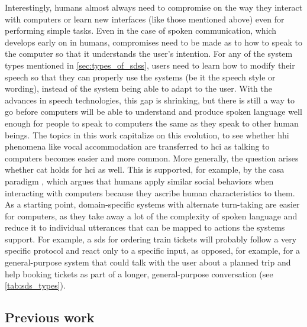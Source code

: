 Interestingly, humans almost always need to compromise on the way they interact with computers or learn new interfaces (like those mentioned above) even for performing simple tasks.
Even in the case of spoken communication, which develops early on in humans, compromises need to be made as to how to speak to the computer so that it understands the user's intention.
For any of the system types mentioned in \cref{sec:types_of_sdss}, users need to learn how to modify their speech so that they can properly use the systems (be it the speech style or wording), instead of the system being able to adapt to the user.
With the advances in speech technologies, this gap is shrinking, but there is still a way to go before computers will be able to understand and produce spoken language well enough for people to speak to computers the same as they speak to other human beings.
The topics in this work capitalize on this evolution, to see whether \ac{hhi} phenomena like vocal accommodation are transferred to \ac{hci} as talking to computers becomes easier and more common.
More generally, the question arises whether \ac{cat} holds for \ac{hci} as well.
This is supported, for example, by the \ac{casa} paradigm \citep{Nass1994computers, Nass2000machines},
which argues that humans apply similar social behaviors when interacting with computers because they ascribe human characteristics to them.
As a starting point, domain-specific systems with alternate turn-taking are easier for computers, as they take away a lot of the complexity of spoken language and reduce it to individual utterances that can be mapped to actions the systems support.
For example, a \ac{sds} for ordering train tickets will probably follow a very specific protocol and react only to a specific input, as opposed, for example, for a general-purpose system that could talk with the user about a planned trip and help booking tickets as part of a longer, general-purpose conversation (see \cref{tab:sds_types}).

\subsection{Previous work}
\label{subsec:previous_work}

